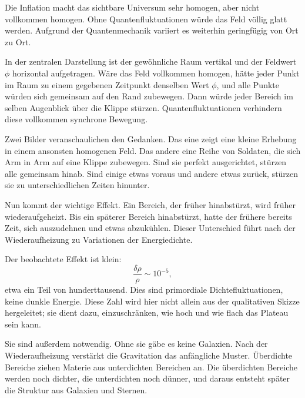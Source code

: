 Die Inflation macht das sichtbare Universum sehr homogen, aber nicht vollkommen homogen. Ohne Quantenfluktuationen würde das Feld völlig glatt werden. Aufgrund der Quantenmechanik variiert es weiterhin geringfügig von Ort zu Ort.

In der zentralen Darstellung ist der gewöhnliche Raum vertikal und der Feldwert \(\phi\) horizontal aufgetragen. Wäre das Feld vollkommen homogen, hätte jeder Punkt im Raum zu einem gegebenen Zeitpunkt denselben Wert \(\phi\), und alle Punkte würden sich gemeinsam auf den Rand zubewegen. Dann würde jeder Bereich im selben Augenblick über die Klippe stürzen. Quantenfluktuationen verhindern diese vollkommen synchrone Bewegung.

Zwei Bilder veranschaulichen den Gedanken. Das eine zeigt eine kleine Erhebung in einem ansonsten homogenen Feld. Das andere eine Reihe von Soldaten, die sich Arm in Arm auf eine Klippe zubewegen. Sind sie perfekt ausgerichtet, stürzen alle gemeinsam hinab. Sind einige etwas voraus und andere etwas zurück, stürzen sie zu unterschiedlichen Zeiten hinunter.

Nun kommt der wichtige Effekt. Ein Bereich, der früher hinabstürzt, wird früher wiederaufgeheizt. Bis ein späterer Bereich hinabstürzt, hatte der frühere bereits Zeit, sich auszudehnen und etwas abzukühlen. Dieser Unterschied führt nach der Wiederaufheizung zu Variationen der Energiedichte.

\begin{classroomqa}
\end{classroomqa}

Der beobachtete Effekt ist klein:
\begin{equation}
\frac{\delta\rho}{\rho}\sim 10^{-5},
\end{equation}
etwa ein Teil von hunderttausend. Dies sind primordiale Dichtefluktuationen, keine dunkle Energie. Diese Zahl wird hier nicht allein aus der qualitativen Skizze hergeleitet; sie dient dazu, einzuschränken, wie hoch und wie flach das Plateau sein kann.

Sie sind außerdem notwendig. Ohne sie gäbe es keine Galaxien. Nach der Wiederaufheizung verstärkt die Gravitation das anfängliche Muster. Überdichte Bereiche ziehen Materie aus unterdichten Bereichen an. Die überdichten Bereiche werden noch dichter, die unterdichten noch dünner, und daraus entsteht später die Struktur aus Galaxien und Sternen.

